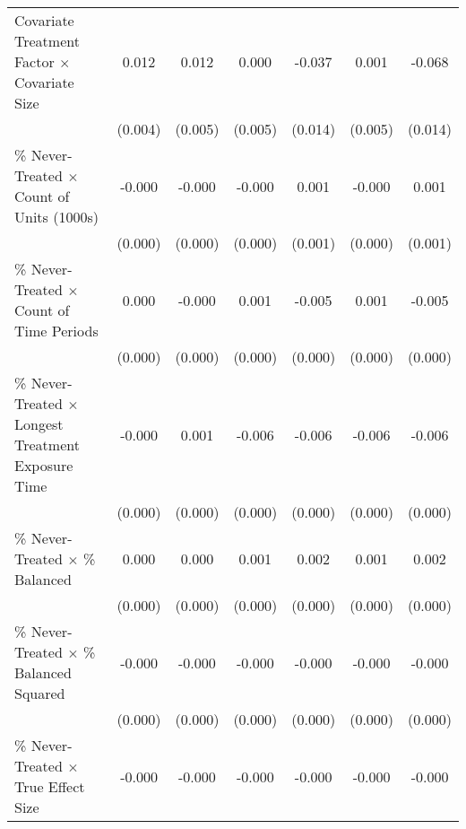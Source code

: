 \begin{table}[htbp]
\begin{tabular}{l*{6}{c}}
Covariate Treatment Factor $\times$ Covariate Size&       0.012\sym{**} &       0.012\sym{**} &       0.000         &      -0.037\sym{**} &       0.001         &      -0.068\sym{***}\\
                    &     (0.004)         &     (0.005)         &     (0.005)         &     (0.014)         &     (0.005)         &     (0.014)         \\
\% Never-Treated $\times$ Count of Units (1000s)&      -0.000         &      -0.000         &      -0.000         &       0.001         &      -0.000         &       0.001         \\
                    &     (0.000)         &     (0.000)         &     (0.000)         &     (0.001)         &     (0.000)         &     (0.001)         \\
\% Never-Treated $\times$ Count of Time Periods&       0.000         &      -0.000\sym{***}&       0.001\sym{***}&      -0.005\sym{***}&       0.001\sym{***}&      -0.005\sym{***}\\
                    &     (0.000)         &     (0.000)         &     (0.000)         &     (0.000)         &     (0.000)         &     (0.000)         \\
\% Never-Treated $\times$ Longest Treatment Exposure Time&      -0.000         &       0.001\sym{***}&      -0.006\sym{***}&      -0.006\sym{***}&      -0.006\sym{***}&      -0.006\sym{***}\\
                    &     (0.000)         &     (0.000)         &     (0.000)         &     (0.000)         &     (0.000)         &     (0.000)         \\
\% Never-Treated $\times$ \% Balanced&       0.000\sym{***}&       0.000\sym{***}&       0.001\sym{***}&       0.002\sym{***}&       0.001\sym{***}&       0.002\sym{***}\\
                    &     (0.000)         &     (0.000)         &     (0.000)         &     (0.000)         &     (0.000)         &     (0.000)         \\
\% Never-Treated $\times$ \% Balanced Squared&      -0.000\sym{***}&      -0.000\sym{***}&      -0.000\sym{***}&      -0.000\sym{***}&      -0.000\sym{***}&      -0.000\sym{***}\\
                    &     (0.000)         &     (0.000)         &     (0.000)         &     (0.000)         &     (0.000)         &     (0.000)         \\
\% Never-Treated $\times$ True Effect Size&      -0.000         &      -0.000         &      -0.000         &      -0.000\sym{*}  &      -0.000         &      -0.000\sym{*}  \\

\end{tabular}
\end{table}
